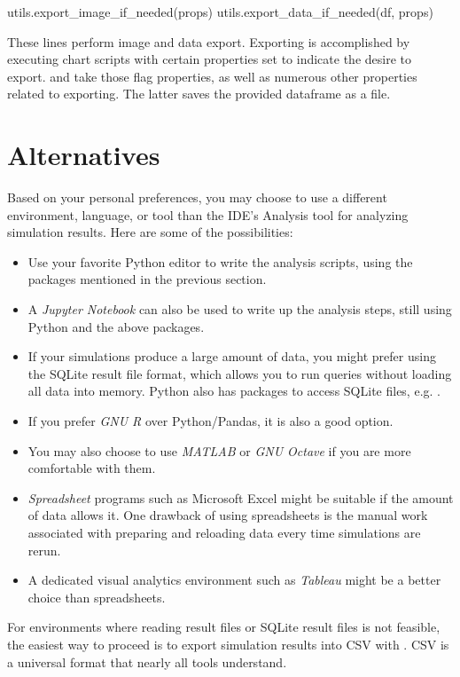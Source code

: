 \begin{python}
utils.export_image_if_needed(props)
utils.export_data_if_needed(df, props)
\end{python}

These lines perform image and data export. Exporting is accomplished by executing
chart scripts with certain properties set to indicate the desire to export.
 and
 take those flag properties, as well as
numerous other properties related to exporting. The latter saves the provided
dataframe as a file.


\section{Alternatives}
\label{sec:ana-sim:result-analysis-alternatives}

Based on your personal preferences, you may choose to use a different
environment, language, or tool than the IDE's Analysis tool for analyzing
simulation results. Here are some of the possibilities:

\begin{itemize}
  \item Use your favorite Python editor to write the analysis scripts, using
    the packages mentioned in the previous section.
  \item A \textit{Jupyter Notebook} can also be used to write up the analysis
    steps, still using Python and the above packages.
  \item If your simulations produce a large amount of data, you might prefer using
    the SQLite result file format, which allows you to run queries without
    loading all data into memory. Python also has packages to access SQLite files,
    e.g. .
  \item If you prefer \textit{GNU R} over Python/Pandas, it is also a good option.
  \item You may also choose to use \textit{MATLAB} or \textit{GNU Octave} if you
    are more comfortable with them.
  \item \textit{Spreadsheet} programs such as Microsoft Excel might be suitable
    if the amount of data allows it. One drawback of using spreadsheets is the
    manual work associated with preparing and reloading data every time
    simulations are rerun.
  \item A dedicated visual analytics environment such as \textit{Tableau} might
    be a better choice than spreadsheets.
\end{itemize}

For environments where reading {\opp} result files or SQLite result files is
not feasible, the easiest way to proceed is to export simulation
results into CSV with . CSV is a universal format that
nearly all tools understand.


